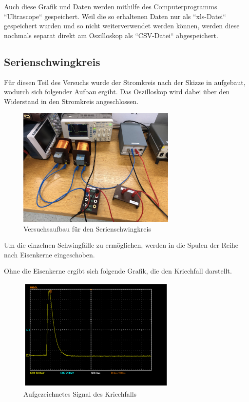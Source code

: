 \documentclass[11pt,ngerman]{scrartcl}
\begin{document}
Auch diese Grafik und Daten werden mithilfe des Computerprogramms ``Ultrascope`` gespeichert. Weil die so erhaltenen Daten nur als
``xls-Datei``
gespeichert wurden und so nicht weiterverwendet werden können, werden diese nochmals separat direkt am Oszilloskop als ``CSV-Datei`` abgespeichert.


\subsection{Serienschwingkreis}

Für diesen Teil des Versuchs wurde der Stromkreis nach der Skizze in \label{fig:abb6} aufgebaut, wodurch sich folgender Aufbau ergibt. Das Oszilloskop wird dabei über den Widerstand in den Stromkreis angeschlossen.

\begin{figure}[H]
	\begin{center}
		\includegraphics[width=0.7\textwidth]{aufbau_spule}
	\end{center}
	\caption{Versuchsaufbau für den Serienschwingkreis}
	\label{fig:aufbau_spule}
\end{figure}

Um die einzelnen Schwingfälle zu ermöglichen, werden in die Spulen der Reihe nach Eisenkerne eingeschoben.

Ohne die Eisenkerne ergibt sich folgende Grafik, die den Kriechfall darstellt.

\begin{figure}[H]
	\begin{center}
		\includegraphics[width=0.7\textwidth]{Bild_versuch3_a}
	\end{center}
	\caption{Aufgezeichnetes Signal des Kriechfalls}
	\label{fig:kriechfall}
\end{figure}
\end{document}
